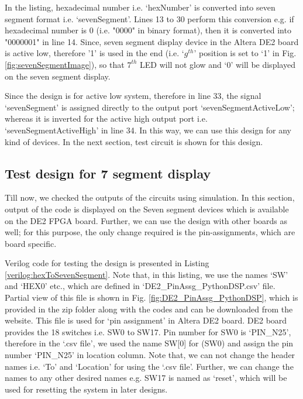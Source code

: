 \begin{explanation}
	In the listing, hexadecimal number i.e. `hexNumber' is converted into seven segment format i.e. `sevenSegment'. Lines 13 to 30 perform this conversion e.g. if hexadecimal number is 0 (i.e. "0000" in binary format),  then it is converted into "0000001" in line 14. Since, seven segment display device in the Altera DE2 board is active low, therefore '1' is used in the end (i.e. `$g^{th}$' position is set to `1' in Fig. \ref{fig:sevenSegmentImage}),  so that $7^{th}$ LED will not glow and `0' will be displayed on the seven segment display. 
	
	Since the design is for active low system, therefore in line 33, the signal `sevenSegment' is assigned directly to the output port `sevenSegmentActiveLow'; whereas it is inverted for the active high output port i.e. `sevenSegmentActiveHigh' in line 34. In this way, we can use this design for any kind of devices. In the next section, test circuit is shown for this design.
\end{explanation}


\subsection{Test design for 7 segment display}
Till now, we checked the outputs of the circuits using simulation. In this section, output of the code is displayed on the Seven segment devices which is available on the DE2 FPGA board. Further, we can use the design with other boards as well; for this purpose, the only change required is the pin-assignments, which are board specific.  

Verilog code for testing the design is presented in Listing \ref{verilog:hexToSevenSegment}. Note that, in this listing, we use the names `SW' and `HEX0' etc., which are defined in `DE2\_PinAssg\_PythonDSP.csv' file. Partial view of this file is shown in Fig. \ref{fig:DE2_PinAssg_PythonDSP}, which is provided in the zip folder along with the codes and can be downloaded from the website. This file is used for `pin assignment' in Altera DE2 board. DE2 board provides the 18 switches i.e. SW0 to SW17. Pin number for SW0 is `PIN\_N25', therefore in the `.csv file', we used the name SW[0] for (SW0) and assign the pin number `PIN\_N25' in location column. Note that, we can not change the header names i.e. `To' and `Location' for using the `.csv file'. Further, we can change the names to any other desired names e.g. SW17 is named as `reset', which will be used for resetting the system in later designs. 

